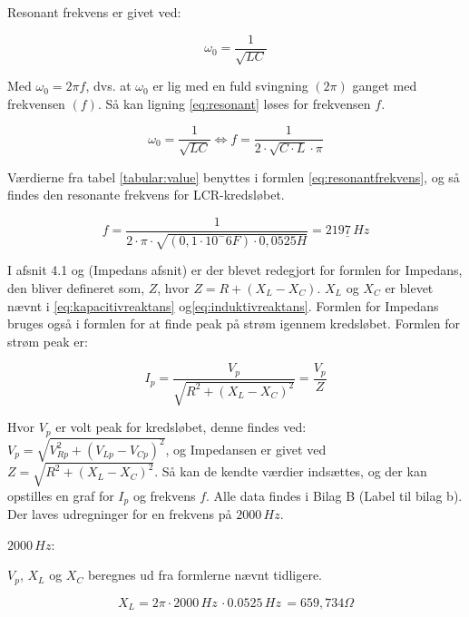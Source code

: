 Resonant frekvens er givet ved:

\begin{equation} 
\omega_0 = \frac{1}{\sqrt{LC}}
\label{eq:resonant}
\end{equation}

Med $\omega_0 = 2 \pi f$, dvs. at $\omega_0$ er lig med en fuld svingning $(2\pi)$ ganget med frekvensen $(f)$. Så kan ligning \ref{eq:resonant} løses for frekvensen $f$.

\begin{equation} 
\omega_0 = \frac{1}{\sqrt{LC}} \Leftrightarrow f = \frac{1}{2 \cdot \sqrt{C \cdot L} \cdot \pi}
\label{eq:resonantfrekvens}
\end{equation}

Værdierne fra tabel \ref{tabular:value} benyttes i formlen \ref{eq:resonantfrekvens}, og så findes den resonante frekvens for LCR-kredsløbet.

\begin{equation*}
f = \frac{1}{2 \cdot \pi \cdot \sqrt{(0,1 \cdot 10^-6 F) \cdot 0,0525 H}} = \underline{2197 \, Hz}
\end{equation*}

I afsnit 4.1 og (Impedans afsnit) er der blevet redegjort for formlen for Impedans, den bliver defineret som, $Z$, hvor $Z = R + (X_L - X_C)$. $X_L$ og $X_C$ er blevet nævnt i \vref{eq:kapacitivreaktans} og\vref{eq:induktivreaktans}. Formlen for Impedans bruges også i formlen for at finde peak på strøm igennem kredsløbet. Formlen for strøm peak er:

\begin{equation} 
I_p = \frac{V_p}{\sqrt{R^2 + (X_L - X_C )^2}} = \frac{V_p}{Z}
\label{eq:peak}
\end{equation}

Hvor $V_p$ er volt peak for kredsløbet, denne findes ved: $V_p = \sqrt{V^2_{Rp} + (V_{Lp} - V_{Cp})^2}$, og Impedansen er givet ved $Z = \sqrt{R^2 + (X_L - X_C)^2}$. Så kan de kendte værdier indsættes, og der kan opstilles en graf for $I_p$ og frekvens $f$. Alle data findes i Bilag B (Label til bilag b). Der laves udregninger for en frekvens på $2000 \, Hz$.

$2000 \, Hz$:

$V_p$, $X_L$ og $X_C$ beregnes ud fra formlerne nævnt tidligere.

\begin{equation*}
X_L = 2\pi \cdot 2000 \, Hz \, \cdot 0.0525 \, Hz \, = 659,734 \Omega
\end{equation*}

